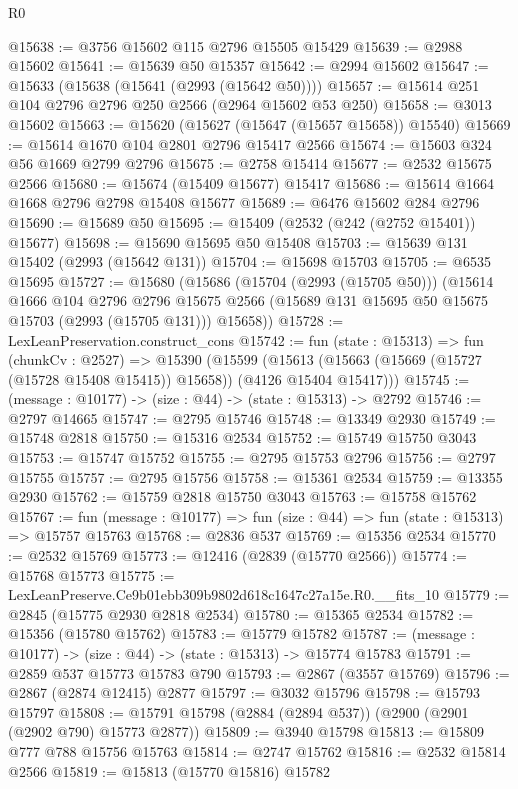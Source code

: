\begin{lexlean}{R0}
\begin{coremodule}
@15638 := @3756 @15602 @115 @2796 @15505 @15429
@15639 := @2988 @15602
@15641 := @15639 @50 @15357
@15642 := @2994 @15602
@15647 := @15633 (@15638 (@15641 (@2993 (@15642 @50))))
@15657 := @15614 @251 @104 @2796 @2796 @250 @2566 (@2964 @15602 @53 @250)
@15658 := @3013 @15602
@15663 := @15620 (@15627 (@15647 (@15657 @15658)) @15540)
@15669 := @15614 @1670 @104 @2801 @2796 @15417 @2566
@15674 := @15603 @324 @56 @1669 @2799 @2796
@15675 := @2758 @15414
@15677 := @2532 @15675 @2566
@15680 := @15674 (@15409 @15677) @15417
@15686 := @15614 @1664 @1668 @2796 @2798 @15408 @15677
@15689 := @6476 @15602 @284 @2796
@15690 := @15689 @50
@15695 := @15409 (@2532 (@242 (@2752 @15401)) @15677)
@15698 := @15690 @15695 @50 @15408
@15703 := @15639 @131 @15402 (@2993 (@15642 @131))
@15704 := @15698 @15703
@15705 := @6535 @15695
@15727 := @15680
    (@15686
      (@15704 (@2993 (@15705 @50)))
      (@15614
        @1666
        @104
        @2796
        @2796
        @15675
        @2566
        (@15689 @131 @15695 @50 @15675 @15703 (@2993 (@15705 @131)))
        @15658))
@15728 := LexLeanPreservation.construct_cons
@15742 := fun (state : @15313) =>
  fun (chunkCv : @2527) =>
  @15390
    (@15599 (@15613 (@15663 (@15669 (@15727 (@15728 @15408 @15415)) @15658)) (@4126 @15404 @15417)))
@15745 := (message : @10177) -> (size : @44) -> (state : @15313) -> @2792
@15746 := @2797 @14665
@15747 := @2795 @15746
@15748 := @13349 @2930
@15749 := @15748 @2818
@15750 := @15316 @2534
@15752 := @15749 @15750 @3043
@15753 := @15747 @15752
@15755 := @2795 @15753 @2796
@15756 := @2797 @15755
@15757 := @2795 @15756
@15758 := @15361 @2534
@15759 := @13355 @2930
@15762 := @15759 @2818 @15750 @3043
@15763 := @15758 @15762
@15767 := fun (message : @10177) => fun (size : @44) => fun (state : @15313) => @15757 @15763
@15768 := @2836 @537
@15769 := @15356 @2534
@15770 := @2532 @15769
@15773 := @12416 (@2839 (@15770 @2566))
@15774 := @15768 @15773
@15775 := LexLeanPreserve.Ce9b01ebb309b9802d618c1647c27a15e.R0.__fits_10
@15779 := @2845 (@15775 @2930 @2818 @2534)
@15780 := @15365 @2534
@15782 := @15356 (@15780 @15762)
@15783 := @15779 @15782
@15787 := (message : @10177) -> (size : @44) -> (state : @15313) -> @15774 @15783
@15791 := @2859 @537 @15773 @15783 @790
@15793 := @2867 (@3557 @15769)
@15796 := @2867 (@2874 @12415) @2877
@15797 := @3032 @15796
@15798 := @15793 @15797
@15808 := @15791 @15798 (@2884 (@2894 @537)) (@2900 (@2901 (@2902 @790) @15773 @2877))
@15809 := @3940 @15798
@15813 := @15809 @777 @788 @15756 @15763
@15814 := @2747 @15762
@15816 := @2532 @15814 @2566
@15819 := @15813 (@15770 @15816) @15782

\end{coremodule}
\end{lexlean}
